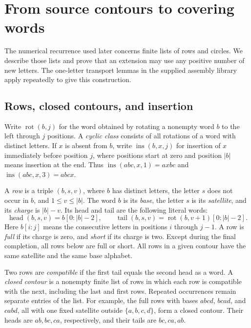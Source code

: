 \section{From source contours to covering words}
\label{sec-assembly}

The numerical recurrence used later concerns finite lists of rows and
circles. We describe those lists and prove that an extension may use any
positive number of new letters. The one-letter transport lemmas in the
supplied assembly library apply repeatedly to give this construction.

\subsection{Rows, closed contours, and insertion}

Write $\operatorname{rot}(b,j)$ for the word obtained by rotating a nonempty
word $b$ to the left through $j$ positions. A \emph{cyclic class} consists
of all rotations of a word with distinct letters. If $x$ is absent from
$b$, write $\operatorname{ins}(b,x,j)$ for insertion of $x$ immediately
before position $j$, where positions start at zero and position $|b|$
means insertion at the end. Thus
$\operatorname{ins}(abc,x,1)=axbc$ and
$\operatorname{ins}(abc,x,3)=abcx$.

A \emph{row} is a triple $(b,s,v)$, where $b$ has distinct letters, the
letter $s$ does not occur in $b$, and $1\le v\le |b|$. The word $b$ is its
\emph{base}, the letter $s$ is its \emph{satellite}, and its \emph{charge}
is $|b|-v$. Its head and tail are the following literal words:
\[
 \operatorname{head}(b,s,v)=b[0:|b|-2],\qquad
 \operatorname{tail}(b,s,v)
   =\operatorname{rot}(b,v+1)[0:|b|-2].
\]
Here $b[i:j]$ means the consecutive letters in positions $i$ through
$j-1$. A row is \emph{full} if its charge is zero, and \emph{short} if
its charge is two. Except during the final completion, all rows below are
full or short. All rows in a given contour have the same satellite and the
same base alphabet.

Two rows are \emph{compatible} if the first tail equals the second head
as a word. A \emph{closed contour} is a nonempty finite list of rows in
which each row is compatible with the next, including the last and first
rows. Repeated occurrences remain separate entries of the list. For
example, the full rows with bases $abcd$, $bcad$, and $cabd$, all with one
fixed satellite outside $\{a,b,c,d\}$, form a closed contour. Their heads
are $ab,bc,ca$, respectively, and their tails are $bc,ca,ab$.

